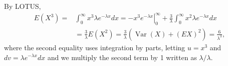 

\setcounter{theorem}{47}
\begin{exercise}[BH.5.48]
\begin{solution}
    By LOTUS,
    $$
    \begin{aligned}
        E\left(X^3\right)=& \int_0^{\infty} x^3 \lambda e^{-\lambda x} d x=-\left.x^3 e^{-\lambda x}\right|_0 ^{\infty}+\frac{3}{\lambda} \int_0^{\infty} x^2 \lambda e^{-\lambda x} d x \\
        &=\frac{3}{\lambda} E\left(X^2\right)=\frac{3}{\lambda}\left(\operatorname{Var}(X)+(E X)^2\right)=\frac{6}{\lambda^3},
    \end{aligned}
    $$
    where the second equality uses integration by parts, letting $u=x^3$ and $d v=\lambda e^{-\lambda x} d x$ and we multiply the second term by 1 written as $\lambda / \lambda$.
\end{solution}
\end{exercise}


